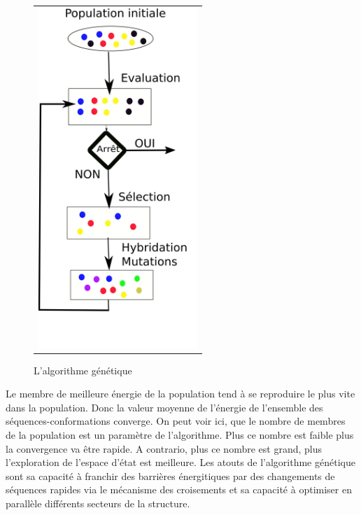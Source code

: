 \begin{figure}[!htbp]
  \centering
  \begin{tabular}{c}
    \includegraphics[width=6cm]{figure/algo_genetique.png} \\
  \end{tabular}
  \caption{L'algorithme génétique}
  \label{algo_gene}
\end{figure}


Le membre de meilleure énergie de la population tend à se reproduire le plus vite dans la population. 
Donc la valeur moyenne de l'énergie de l'ensemble des séquences-conformations converge.
On peut voir ici, que le nombre de membres de la population est un paramètre de l'algorithme. Plus ce nombre est faible plus la convergence va être rapide. A contrario, plus ce nombre est grand, plus l'exploration de l'espace d'état est meilleure.
Les atouts de l'algorithme génétique sont sa capacité à franchir des barrières énergitiques par des changements de séquences rapides via le mécanisme des croisements et sa capacité à optimiser en parallèle différents secteurs de la structure.

